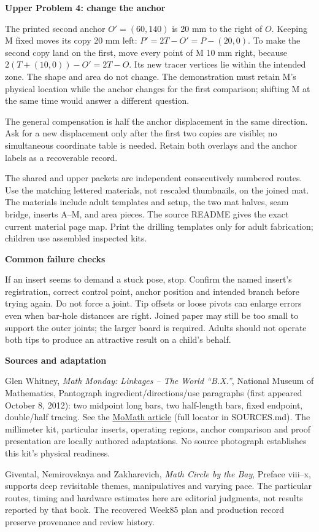 \documentclass[11pt,letterpaper]{article}
\newcommand{\heading}[1]{\par\vspace{4pt}{\large\bfseries #1}\par}
\newcommand{\sub}[1]{\par\textbf{#1}\par}
\begin{document}
\sub{Upper Problem 4: change the anchor}
The printed second anchor $O'=(60,140)$ is 20 mm to the right of $O$. Keeping M fixed moves its copy 20 mm left: $P'=2T-O'=P-(20,0)$. To make the second copy land on the first, move every point of M 10 mm right, because $2(T+(10,0))-O'=2T-O$. Its new tracer vertices lie within the intended zone. The shape and area do not change. The demonstration must retain M's physical location while the anchor changes for the first comparison; shifting M at the same time would answer a different question.

The general compensation is half the anchor displacement in the same direction. Ask for a new displacement only after the first two copies are visible; no simultaneous coordinate table is needed. Retain both overlays and the anchor labels as a recoverable record.
\newpage
\heading{Print selection, provenance and use record}
The shared and upper packets are independent consecutively numbered routes. Use the matching lettered materials, not rescaled thumbnails, on the joined mat. The materials include adult templates and setup, the two mat halves, seam bridge, inserts A--M, and area pieces. The source README gives the exact current material page map. Print the drilling templates only for adult fabrication; children use assembled inspected kits.

\sub{Common failure checks}
If an insert seems to demand a stuck pose, stop. Confirm the named insert's registration, correct control point, anchor position and intended branch before trying again. Do not force a joint. Tip offsets or loose pivots can enlarge errors even when bar-hole distances are right. Joined paper may still be too small to support the outer joints; the larger board is required. Adults should not operate both tips to produce an attractive result on a child's behalf.

\sub{Sources and adaptation}
Glen Whitney, \emph{Math Monday: Linkages -- The World ``B.X.''}, National Museum of Mathematics, Pantograph ingredient/directions/use paragraphs (first appeared October 8, 2012): two midpoint long bars, two half-length bars, fixed endpoint, double/half tracing. See the \href{https://momath.org/mathmonday/math-monday-01-03-11/math-monday-linkages-the-world-b-x/}{MoMath article} (full locator in SOURCES.md). The millimeter kit, particular inserts, operating regions, anchor comparison and proof presentation are locally authored adaptations. No source photograph establishes this kit's physical readiness.

Givental, Nemirovskaya and Zakharevich, \emph{Math Circle by the Bay}, Preface viii--x, supports deep revisitable themes, manipulatives and varying pace. The particular routes, timing and hardware estimates here are editorial judgments, not results reported by that book. The recovered Week85 plan and production record preserve provenance and review history.
\end{document}
